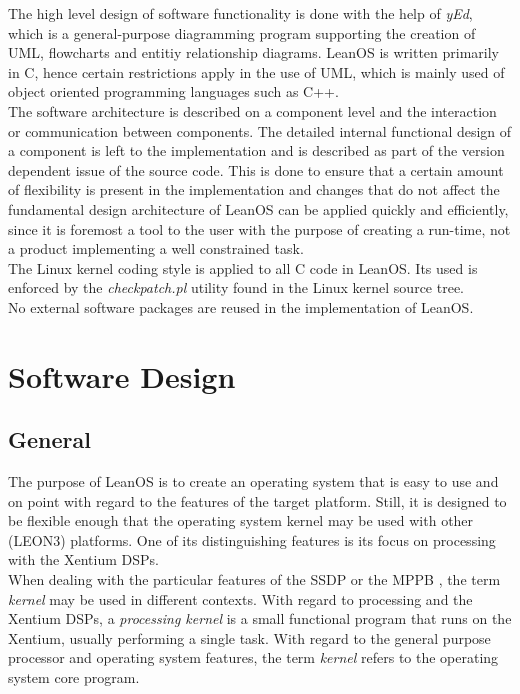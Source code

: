 The high level design of software functionality is done with the help of
\emph{yEd}, which is a general-purpose diagramming program supporting the
creation of UML, flowcharts and entitiy relationship diagrams.
LeanOS is written primarily in C, hence certain restrictions apply in the use of
UML, which is mainly used of object oriented programming languages such as C++.
\\

The software architecture is described on a component level and the interaction
or communication between components. The detailed internal functional design of
a component is left to the implementation and is described as part of the
version dependent issue of the source code. This is done to ensure that a
certain amount of flexibility is present in the implementation and changes that
do not affect the fundamental design architecture of LeanOS can be applied
quickly and efficiently, since it is foremost a tool to the user with the
purpose of creating a run-time, not a product implementing a well constrained
task.\\

The Linux kernel coding style is applied to all C code in LeanOS. Its used is
enforced by the \emph{checkpatch.pl} utility found in the Linux kernel source
tree.\\

No external software packages are reused in the implementation of LeanOS.


\chapter{Software Design}


\section{General}


The purpose of LeanOS is to create an operating system that is easy to use and on
point with regard to the features of the target platform. Still, it is designed
to be flexible enough that the operating system kernel may be used with other
(\gls{LEON3}) platforms. One of its distinguishing features is its focus on
processing with the \gls{Xentium} \glspl{DSP}.\\

\noindent
When dealing with the particular features of the \gls{SSDP} or the \gls{MPPB}
\cite{MPPB}, the term \emph{kernel} may be used in different contexts.
With regard to processing and the \gls{Xentium} \glspl{DSP}, a
\emph{processing kernel} is a small functional program that runs on the
\gls{Xentium}, usually performing a single task. With regard to the general
purpose processor and operating system features, the term \emph{kernel} refers
to the operating system core program. \\


